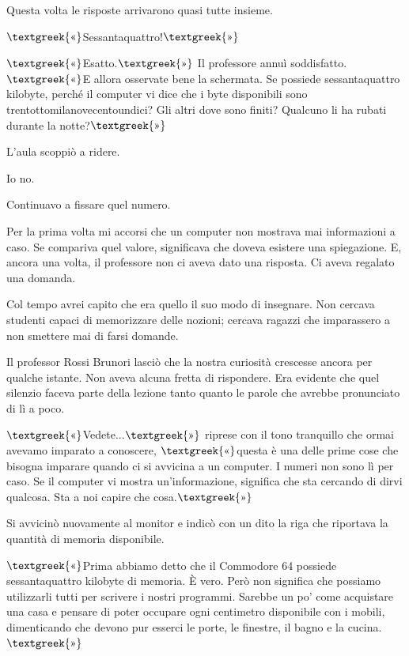 \documentclass{article}
\begin{document}
Questa volta le risposte arrivarono quasi tutte insieme.

$\text{\textgreek{«}}$Sessantaquattro!$\text{\textgreek{»}}$

$\text{\textgreek{«}}$Esatto.$\text{\textgreek{»}}$ Il professore annuì soddisfatto. $\text{\textgreek{«}}$E allora
osservate bene la schermata. Se possiede sessantaquattro kilobyte, perché il computer vi dice che i byte disponibili
sono trentottomilanovecentoundici? Gli altri dove sono finiti? Qualcuno li ha rubati durante la
notte?$\text{\textgreek{»}}$

L'aula scoppiò a ridere.

Io no.

Continuavo a fissare quel numero.

Per la prima volta mi accorsi che un computer non mostrava mai informazioni a caso. Se compariva quel valore,
significava che doveva esistere una spiegazione. E, ancora una volta, il professore non ci aveva dato una risposta. Ci
aveva regalato una domanda.

Col tempo avrei capito che era quello il suo modo di insegnare. Non cercava studenti capaci di memorizzare delle
nozioni; cercava ragazzi che imparassero a non smettere mai di farsi domande.

Il professor Rossi Brunori lasciò che la nostra curiosità crescesse ancora per qualche istante. Non aveva alcuna fretta
di rispondere. Era evidente che quel silenzio faceva parte della lezione tanto quanto le parole che avrebbe pronunciato
di lì a poco.

$\text{\textgreek{«}}$Vedete...$\text{\textgreek{»}}$ riprese con il tono tranquillo che ormai avevamo imparato a
conoscere, $\text{\textgreek{«}}$questa è una delle prime cose che bisogna imparare quando ci si avvicina a un
computer. I numeri non sono lì per caso. Se il computer vi mostra un'informazione, significa che sta cercando di dirvi
qualcosa. Sta a noi capire che cosa.$\text{\textgreek{»}}$

Si avvicinò nuovamente al monitor e indicò con un dito la riga che riportava la quantità di memoria disponibile.

$\text{\textgreek{«}}$Prima abbiamo detto che il Commodore 64 possiede sessantaquattro kilobyte di memoria. È vero. Però
non significa che possiamo utilizzarli tutti per scrivere i nostri programmi. Sarebbe un po' come acquistare una casa e
pensare di poter occupare ogni centimetro disponibile con i mobili, dimenticando che devono pur esserci le porte, le
finestre, il bagno e la cucina.$\text{\textgreek{»}}$
\end{document}
